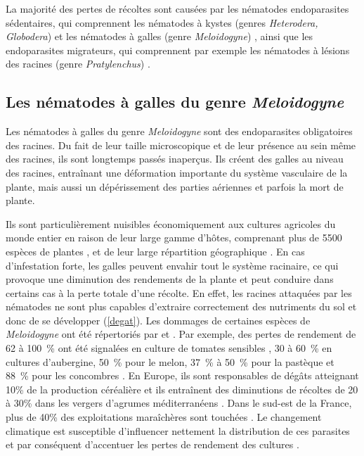 La majorité des pertes de récoltes sont causées par les nématodes endoparasites sédentaires, qui comprennent les nématodes à kystes (genres \textit{Heterodera, Globodera})  \citep{Perry2018} et les  nématodes à galles (genre \textit{Meloidogyne}) \citep{Perry2009}, ainsi que les endoparasites migrateurs, qui comprennent par exemple les nématodes à lésions des racines (genre \textit{Pratylenchus}) \citep{Mass1998}. 
 
\subsection{Les nématodes à galles du genre \textit{Meloidogyne}}
	
	Les nématodes à galles du genre \textit{Meloidogyne} sont des endoparasites obligatoires des racines. Du fait de leur taille microscopique et de leur présence au sein même des racines, ils sont longtemps passés inaperçus.  Ils créent des galles au niveau des racines, entraînant une déformation importante du système vasculaire  de la plante, mais aussi  un dépérissement des parties aériennes et parfois la mort de plante.

	Ils sont particulièrement nuisibles économiquement aux cultures agricoles du monde entier en raison de leur large gamme d'hôtes, comprenant plus de 5500 espèces de plantes \citep{Blok2008}, et de leur large répartition géographique \citep{Jones2013}.  En cas d’infestation forte, les galles peuvent envahir tout le système racinaire, ce qui provoque une diminution des rendements de la plante  et  peut conduire dans certains cas à la perte totale d’une récolte. En effet, les racines attaquées par les nématodes ne sont plus capables d’extraire correctement des nutriments du sol et donc de se développer (\autoref{degat}).  Les dommages  de certaines espèces de \textit{Meloidogyne} ont été répertoriés par \citet{Greco2010} et \citet{Wesemael2011}.  Par exemple, des pertes de rendement de 62 à 100~\% ont été signalées en culture de tomates sensibles  \citep{Seid2015, Gine2017}, 30 à 60~\% en cultures d'aubergine, 50~\% pour le melon,  37~\% à 50~\% pour la  pastèque \citep{Sikora2005} et 88~\% pour les concombres \citep{Gine2017}. 
En Europe, ils sont responsables de dégâts atteignant 10\% de la production céréalière et ils  entraînent des diminutions de récoltes de 20 à 30\% dans les vergers d'agrumes méditerranéens \citep{Feldmesser1971}.  Dans le sud-est de la France,  plus de 40\% des exploitations maraîchères sont touchées \citep{Djian-Caporalino2010, Djian-Caporalino2012}.
Le changement climatique est susceptible d'influencer nettement  la distribution de ces parasites et par conséquent d'accentuer les pertes de rendement des  cultures \citep{Bebber2014}. 

